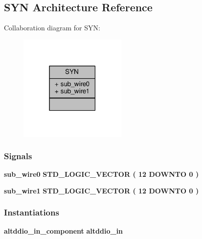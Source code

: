 \subsection{S\+YN Architecture Reference}
\label{classddri_1_1SYN}


Collaboration diagram for S\+YN\+:\nopagebreak
\begin{figure}[H]
\begin{center}
\leavevmode
\includegraphics[width=150pt]{d5/d85/classddri_1_1SYN__coll__graph}
\end{center}
\end{figure}
\subsubsection*{Signals}
 \begin{DoxyCompactItemize}
\item 
{\bf sub\+\_\+wire0} {\bfseries \textcolor{comment}{S\+T\+D\+\_\+\+L\+O\+G\+I\+C\+\_\+\+V\+E\+C\+T\+OR}\textcolor{vhdlchar}{ }\textcolor{vhdlchar}{(}\textcolor{vhdlchar}{ }\textcolor{vhdlchar}{ } \textcolor{vhdldigit}{12} \textcolor{vhdlchar}{ }\textcolor{keywordflow}{D\+O\+W\+N\+TO}\textcolor{vhdlchar}{ }\textcolor{vhdlchar}{ } \textcolor{vhdldigit}{0} \textcolor{vhdlchar}{ }\textcolor{vhdlchar}{)}\textcolor{vhdlchar}{ }} 
\item 
{\bf sub\+\_\+wire1} {\bfseries \textcolor{comment}{S\+T\+D\+\_\+\+L\+O\+G\+I\+C\+\_\+\+V\+E\+C\+T\+OR}\textcolor{vhdlchar}{ }\textcolor{vhdlchar}{(}\textcolor{vhdlchar}{ }\textcolor{vhdlchar}{ } \textcolor{vhdldigit}{12} \textcolor{vhdlchar}{ }\textcolor{keywordflow}{D\+O\+W\+N\+TO}\textcolor{vhdlchar}{ }\textcolor{vhdlchar}{ } \textcolor{vhdldigit}{0} \textcolor{vhdlchar}{ }\textcolor{vhdlchar}{)}\textcolor{vhdlchar}{ }} 
\end{DoxyCompactItemize}
\subsubsection*{Instantiations}
 \begin{DoxyCompactItemize}
\item 
{\bf altddio\+\_\+in\+\_\+component}  {\bfseries altddio\+\_\+in}   
\end{DoxyCompactItemize}


